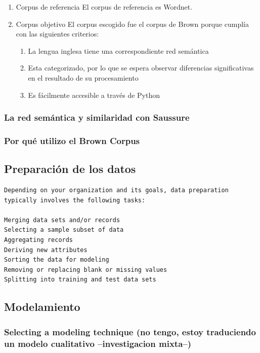 \documentclass[twoside]{article}
\begin{document}
\begin{enumerate}
\item Corpus de referencia
\label{sec:org58d1960}
El corpus de referencia es Wordnet. 
\item Corpus objetivo
\label{sec:org885a2ca}
El corpus escogido fue el corpus de Brown porque cumplía con las siguientes criterios:
\begin{enumerate}
\item La lengua inglesa tiene una correspondiente red semántica
\item Esta categorizado, por lo que se espera observar diferencias significativas en el resultado de su procesamiento
\item Es fácilmente accesible a través de Python
\end{enumerate}
\end{enumerate}

\subsubsection{La red semántica y similaridad con Saussure}
\label{sec:org290b068}
\subsubsection{Por qué utilizo el Brown Corpus}
\label{sec:orgd320abc}
\subsection{Preparación de los datos}
\label{sec:org3fe2700}

\begin{verbatim}
Depending on your organization and its goals, data preparation typically involves the following tasks:

Merging data sets and/or records
Selecting a sample subset of data
Aggregating records
Deriving new attributes
Sorting the data for modeling
Removing or replacing blank or missing values
Splitting into training and test data sets

\end{verbatim}
\subsection{Modelamiento}
\label{sec:orge203b5c}
\subsubsection{Selecting a modeling technique (no tengo, estoy traduciendo un modelo cualitativo --investigacion mixta--)}
\label{sec:org33cba80}
\end{document}
